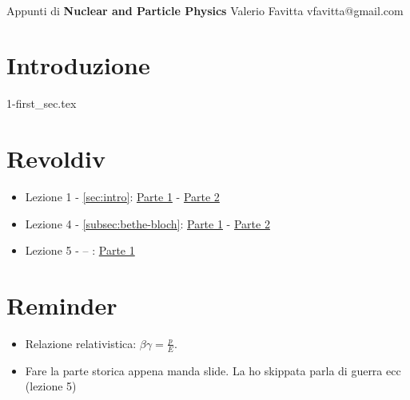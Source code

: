 \documentclass[11pt]{article}
\begin{document}
\newcommand*\subtxt[1]{_{\textnormal{#1}}}
\DeclareRobustCommand\_{\ifmmode\expandafter\subtxt\else\textunderscore\fi}

\thispagestyle{empty}
\bigskip \
\vspace{0.1cm}

\begin{center}
{\fontsize{22}{22} \selectfont Appunti di}
\vskip 16pt
{\fontsize{36}{36} \selectfont \bf \sffamily Nuclear and Particle Physics}
\vskip 24pt
{\fontsize{18}{18} \selectfont \rmfamily Valerio Favitta} 
\vskip 6pt
{\fontsize{14}{14} \selectfont \ttfamily vfavitta@gmail.com} 
\vskip 24pt
\end{center}

{\parindent0pt \baselineskip=15.5pt \lipsum[1-4]}

\newpage
\microtoc
\newpage

\section{Introduzione}\label{sec:intro}
{1-first_sec.tex}

\appendix
\section{Revoldiv}
\begin{itemize}
    \item Lezione 1 - \autoref{sec:intro}: \href{https://revoldiv.com/posts/3e690ced-59b5-4a12-afd3-b81f8b8bc33e/}{Parte 1} - \href{https://revoldiv.com/posts/c176a40e-37f7-42c6-8d04-7b0202a01a87/}{Parte 2}
    \item Lezione 4 - \autoref{subsec:bethe-bloch}: \href{https://revoldiv.com/posts/c78e64f8-8da8-408d-a926-01382707eab4}{Parte 1} - \href{https://revoldiv.com/posts/0bc7cedb-0f13-49aa-94b2-363b8a6feb88}{Parte 2}
    \item Lezione 5 - -- : \href{https://revoldiv.com/posts/969f4a40-a80a-4e9f-aa63-0e01e39670c4}{Parte 1}
\end{itemize}
\section{Reminder}
\begin{itemize}
    \item Relazione relativistica: $\beta\gamma=\frac p E$.
    \item Fare la parte storica appena manda slide. La ho skippata parla di guerra ecc (lezione 5)
\end{itemize}
\end{document}
